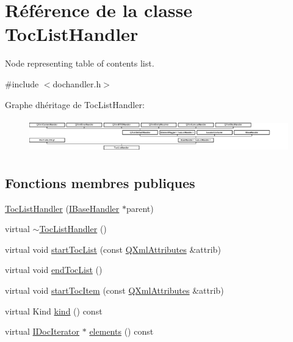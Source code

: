 \hypertarget{class_toc_list_handler}{}\section{Référence de la classe Toc\+List\+Handler}
\label{class_toc_list_handler}


Node representing table of contents list.  




{\ttfamily \#include $<$dochandler.\+h$>$}

Graphe d\textquotesingle{}héritage de Toc\+List\+Handler\+:\begin{figure}[H]
\begin{center}
\leavevmode
\includegraphics[height=1.474654cm]{class_toc_list_handler}
\end{center}
\end{figure}
\subsection*{Fonctions membres publiques}
\begin{DoxyCompactItemize}
\item 
\hyperlink{class_toc_list_handler_a01297aa2307db2980356c78861d851b9}{Toc\+List\+Handler} (\hyperlink{class_i_base_handler}{I\+Base\+Handler} $\ast$parent)
\item 
virtual \hyperlink{class_toc_list_handler_ae79d6fc05ac3ef3ba432009067533601}{$\sim$\+Toc\+List\+Handler} ()
\item 
virtual void \hyperlink{class_toc_list_handler_af2e57f82f520955b2c883462978c8f41}{start\+Toc\+List} (const \hyperlink{class_q_xml_attributes}{Q\+Xml\+Attributes} \&attrib)
\item 
virtual void \hyperlink{class_toc_list_handler_add767203f15a6d91adab55044cfef42c}{end\+Toc\+List} ()
\item 
virtual void \hyperlink{class_toc_list_handler_a3a7201f53e8e9e8ee81baf26a3384f63}{start\+Toc\+Item} (const \hyperlink{class_q_xml_attributes}{Q\+Xml\+Attributes} \&attrib)
\item 
virtual Kind \hyperlink{class_toc_list_handler_a75a3decd9f966ae5a4042e8ebd814772}{kind} () const 
\item 
virtual \hyperlink{class_i_doc_iterator}{I\+Doc\+Iterator} $\ast$ \hyperlink{class_toc_list_handler_a4660bd6833508534eb67bb1ad57a4b49}{elements} () const 
\end{DoxyCompactItemize}
